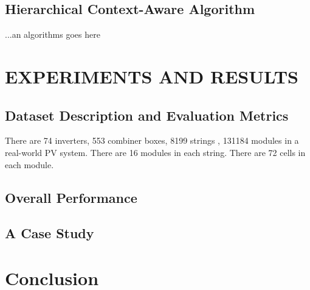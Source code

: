 \documentclass[journal]{IEEEtran}
\begin{document}
\subsection{Hierarchical Context-Aware Algorithm}
...an algorithms goes here

\section{EXPERIMENTS AND RESULTS}
 \label{sctn:Exp}
\subsection{Dataset Description and Evaluation Metrics}
There are 74 inverters, 553 combiner boxes, 8199 strings , 131184 modules in a real-world PV system. There are 16 modules in each string. There are 72 cells in each module.
\subsection{Overall Performance}
\subsection{A Case Study}
\section{Conclusion}
\label{sctn:cnclusn}


%
\end{document}
